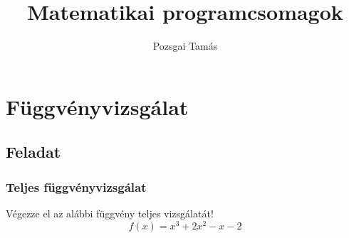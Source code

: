 \documentclass[ignorenonframetext]{beamer}
\title{Matematikai programcsomagok}
\author{Pozsgai Tamás}
\institute[Pannon Egyetem]{}
\begin{document}

\frame{\titlepage} %


\frame{
    \tableofcontents
}

\section{Függvényvizsgálat}
\subsection{Feladat}
\begin{frame}[fragile]
    \frametitle{Teljes függvényvizsgálat}
    Végezze el az alábbi függvény teljes vizsgálatát!
    \[
        f(x)=x^3+2x^2-x-2
    \]

\end{frame}
\end{document}
